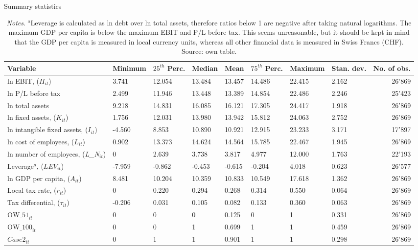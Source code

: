 \documentclass[10pt,twocolumn,oneside,cmyk]{article}
\begin{document}
\begin{table*}[!]
\footnotesize
 \begin{center}
  \caption{Summary statistics}\label{tab2}
   \begin{tabularx}{\textwidth}{l *{7}{Y} r}
   \toprule
   Variable& Minimum &$25^{th}$ Perc. &Median &Mean &$75^{th}$ Perc. &Maximum &Stan. dev. &No. of obs.\\
   \midrule
   ln EBIT, ($\Pi_{it}$) &3.741 &12.054 &13.484 &13.457 &14.486 &22.415 &2.162 &26'869\\
   ln P/L before tax &2.499 &11.946 &13.448 &13.389 &14.854 &22.486 &2.246 &25'423\\
   ln total assets &9.218 &14.831 &16.085 &16.121 &17.305 &24.417 &1.918 &26'869\\
   ln fixed assets, ($K_{it}$) &1.756 &12.031 &13.980 &13.942 &15.812 &24.063 &2.752 &26'869\\
   ln intangible fixed assets, ($I_{it}$) &-4.560 &8.853 &10.890 &10.921 &12.915 &23.233 &3.171 &17'897\\
   ln cost of employees, ($L_{it}$) &0.902 &13.373 &14.624 &14.564 &15.785 &22.467 &1.945 &26'869\\
   ln number of employees, (\textit{L\_N}$_{it}$) &0 &2.639 &3.738 &3.817 &4.977 &12.000 &1.763 &22'193\\
   Leverage$^a$, ($LEV_{it}$) &-7.959 &-0.862 &-0.453 &-0.615 &-0.204 &4.018 &0.623 &26'577\\
   ln GDP per capita, ($A_{it}$) &8.481 &10.204 &10.359 &10.833 &10.549 &17.618 &1.362 &26'869\\
   Local tax rate, ($r_{it}$) &0 &0.220 &0.294 &0.268 &0.314 &0.550 &0.064 &26'869\\
   Tax differential, ($\tau_{it}$) &-0.206 &0.031 &0.105 &0.082 &0.133 &0.360 &0.063 &26'869\\
   $\text{OW\_51}_{it}$ &0 &0 &0 &0.125 &0 &1 &0.331 &26'869\\
   $\text{OW\_100}_{it}$ &0 &0 &1 &0.699 &1 &1 &0.459 &26'869\\ 
   $Case2_{it}$ &0 &1 &1 &0.901 &1 &1 &0.298 &26'869\\   
   \bottomrule
  \end{tabularx}
 \caption*{\footnotesize{\textit{Notes}. $^a$Leverage is calculated as ln debt over ln total assets, therefore ratios below 1 are negative after taking natural logarithms. The maximum GDP per capita is below the maximum EBIT and P/L before tax. This seems unreasonable, but it should be kept in mind that the GDP per capita is measured in local currency units, whereas all other financial data is measured in Swiss Francs (CHF). Source: own table.}}
 \end{center}
\end{table*}
\end{document}
